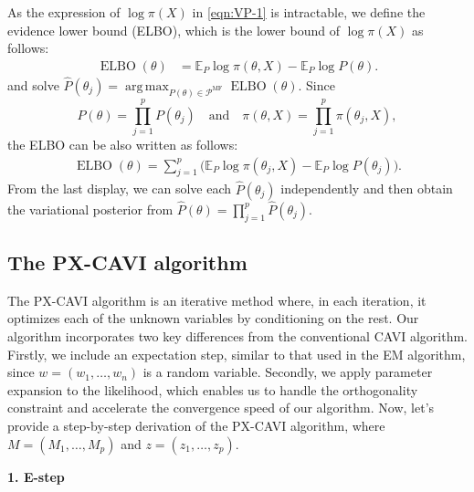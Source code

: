 \documentclass[pdftex, noinfoline, letter]{imsart}
\DeclareMathOperator*{\argmax}{arg\,max}
\DeclareMathOperator*{\ELBO}{\text{ELBO}}
\theoremstyle{plain}
\begin{document}
As the expression of $\log \pi(X)$ in \eqref{eqn:VP-1} is intractable, we define the evidence lower bound (ELBO), which is the lower bound of $\log \pi(X)$ as follows:
\begin{align}
\label{eqn:ELBO}
    \ELBO(\theta) & =
    \mathbb{E}_P \log\pi(\theta, X) - \mathbb{E}_P \log P(\theta).
\end{align}
and solve $\widehat  P(\theta_j) = \argmax_{P(\theta) \in \mathcal{P}^{\text{MF}}}\ELBO(\theta)$.
Since 
$$P(\theta) = \prod_{j=1}^p P(\theta_j)\quad \text{and} \quad\pi(\theta, X) = \prod_{j=1}^p \pi(\theta_j, X),$$ the ELBO can be also written as follows:
\begin{align*}
    \ELBO(\theta) = 
    \sum_{j=1}^p 
    \Big(
    \mathbb{E}_P \log\pi(\theta_j, X)
    -
    \mathbb{E}_P \log P(\theta_j)
    \Big).
\end{align*}
From the last display, we can solve each $\widehat  P(\theta_j)$ independently and then obtain
the variational posterior from $\widehat  P(\theta) = \prod_{j=1}^p \widehat  P(\theta_j)$.


\subsection{The PX-CAVI algorithm}
\label{sec:CAVI}

The PX-CAVI algorithm is an iterative method where, in each iteration, it optimizes each of the unknown variables by conditioning on the rest.
Our algorithm incorporates two key differences from the conventional CAVI algorithm. Firstly, we include an expectation step, similar to that used in the EM algorithm, since $w = (w_1, \dots, w_n)$ is a random variable. Secondly, we apply parameter expansion to the likelihood, which enables us to handle the orthogonality constraint and accelerate the convergence speed of our algorithm. Now, let's provide a step-by-step derivation of the PX-CAVI algorithm, where $M= (M_1, \dots, M_p)$ and 
$z = (z_1, \dots, z_p)$.
\medskip


{\bf 1. E-step} 
\end{document}
